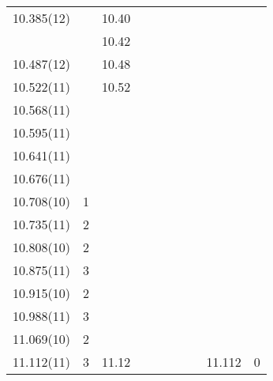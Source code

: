 \begin{landscape}
\begin{center}
\begin{longtable}{cc cc cc cc cc}
  10.385(12)    &              & 10.40    &         &            &                &       &          &          &      \\
                &              & 10.42    &         &            &                &       &          &          &      \\
  10.487(12)    &              & 10.48    &         &            &                &       &          &          &      \\
  10.522(11)    &              & 10.52    &         &            &                &       &          &          &      \\
    10.568(11)  &              &          &         &            &                &       &          &          &      \\                  
  10.595(11)    &              &          &         &            &                &       &          &          &      \\
     10.641(11) &              &          &         &            &                &       &          &          &      \\
     10.676(11) &              &          &         &            &                &       &          &          &      \\
     10.708(10) & 1            &          &         &            &                &       &          &          &      \\
     10.735(11) & 2            &          &         &            &                &       &          &          &      \\
     10.808(10) & 2            &          &         &            &                &       &          &          &      \\
     10.875(11) & 3            &          &         &            &                &       &          &          &      \\
     10.915(10) & 2            &          &         &            &                &       &          &          &      \\
   10.988(11)   & 3            &          &         &            &                &       &          &          &      \\
    11.069(10)  & 2            &          &         &            &                &       &          &          &      \\
     11.112(11) & 3            & 11.12    &         &            &                &       &          & 11.112   & 0    \\

\end{longtable}
\end{center}
\end{landscape}
